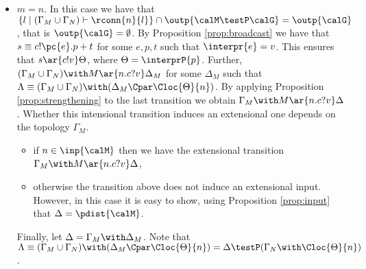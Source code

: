 \documentclass{LMCS}
\begin{document}
\begin{enumerate}
\begin{itemize}
	\item $m = n$. In this case we have that $\{l \;|\; 
	(\Gamma_M \cup \Gamma_N) \vdash \rconn{n}{l}\} \cap 
	\outp{\calM \testP \calG} = \outp{\calG}$, that is 
	$\outp{\calG} = \emptyset$. By Proposition \ref{prop:broadcast} 
	we have that $s \equiv c!\pc{e}.p+t$ for some $e,p,t$ such that 
	$\interpr{e} =v$. This ensures that $s \ar{c!v} \Theta$, where 
	$\Theta = \interprP{p}$. Further, $(\Gamma_M \cup \Gamma_N) \with M 
	\ar{n.c?v} \Delta_M$ for some $\Delta_M$ such that 
	$\Lambda \equiv (\Gamma_M \cup \Gamma_N) \with 
	(\Delta_M \Cpar \Cloc{\Theta}{n})$. 
	By applying Proposition \ref{prop:strengthening} to the last transition 
	we obtain $\Gamma_M \with M \ar{n.c?v} \Delta$. Whether this intensional 
	transition induces an extensional one depends on the topology 
	$\Gamma_M$. 
		\begin{itemize}
		\item if $n \in \inp{\calM}$ then we have the 
		extensional transition $\Gamma_M \with M \ar{n.c?v} \Delta$, 
		\item otherwise the transition above does not induce an extensional 
		input. However, in this case it is easy to show, using Proposition 
		\ref{prop:input} that $\Delta = \pdist{\calM}$. 
		\end{itemize}
	Finally, let $\Delta = \Gamma_M \with \Delta_M$. Note that 
	$\Lambda \equiv (\Gamma_M \cup \Gamma_N) 
	\with (\Delta_M \Cpar \Cloc{\Theta}{n}) = 
	\Delta \testP (\Gamma_N \with \Cloc{\Theta}{n})$.
	\end{itemize}
\end{enumerate} 
\end{document}

